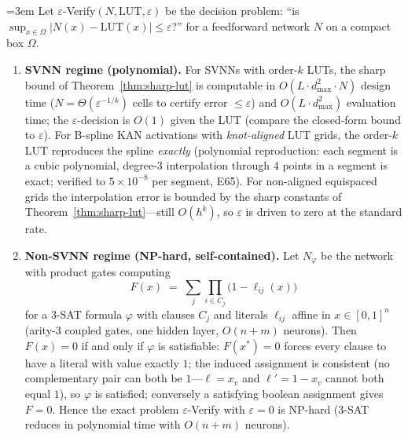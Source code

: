 \setcounter{theorem}{4}
\begin{theorem}
\label{thm:necessity}
\begingroup{}\emergencystretch=3em
Let $\varepsilon$-Verify$(N, \mathrm{LUT}, \varepsilon)$ be the decision
problem: ``is \allowbreak$\sup_{x\in\Omega} |N(x) - \mathrm{LUT}(x)| \leq \varepsilon$?''
for a feedforward network $N$ on a compact box $\Omega$.\par\endgroup

\begin{enumerate}
    \item \textbf{SVNN regime (polynomial).} For SVNNs with order-$k$
    LUTs, the sharp bound of Theorem~\ref{thm:sharp-lut} is computable in
    $O(L \cdot d_{\max}^2 \cdot N)$ design time
    ($N = \Theta(\varepsilon^{-1/k})$ cells to certify error $\leq
    \varepsilon$) and $O(L \cdot d_{\max}^2)$ evaluation time; the
    $\varepsilon$-decision is $O(1)$ given the LUT (compare the closed-form
    bound to $\varepsilon$). For B-spline KAN activations with
    \emph{knot-aligned} LUT grids, the order-$k$ LUT reproduces the spline
    \emph{exactly} (polynomial reproduction: each segment is a cubic
    polynomial, degree-3 interpolation through 4 points in a segment is
    exact; verified to $5 \times 10^{-8}$ per segment, E65). For
    non-aligned equispaced grids the interpolation error is bounded by the
    sharp constants of Theorem~\ref{thm:sharp-lut}---still $O(h^k)$,
    so $\varepsilon$ is driven to zero at the standard rate.

    \item \textbf{Non-SVNN regime (NP-hard, self-contained).} Let
    $N_\varphi$ be the network with product gates computing
    \begin{equation}
    F(x) \;=\; \sum_{j} \prod_{i \in C_j} \bigl(1 - \ell_{ij}(x)\bigr)
    \label{eq:product_gate}
    \end{equation}
    for a 3-SAT formula $\varphi$ with clauses $C_j$ and literals
    $\ell_{ij}$ affine in $x \in [0,1]^n$ (arity-3 coupled gates, one
    hidden layer, $O(n + m)$ neurons). Then $F(x) = 0$ if and only if
    $\varphi$ is satisfiable: $F(x^*) = 0$ forces every clause to have a
    literal with value exactly $1$; the induced assignment is consistent
    (no complementary pair can both be $1$---$\ell = x_v$ and
    $\ell' = 1 - x_v$ cannot both equal $1$), so $\varphi$ is satisfied;
    conversely a satisfying boolean assignment gives $F = 0$. Hence the
    exact problem $\varepsilon$-Verify with $\varepsilon = 0$ is
    NP-hard (3-SAT reduces in polynomial time with $O(n+m)$ neurons).


\end{enumerate}
\end{theorem}
